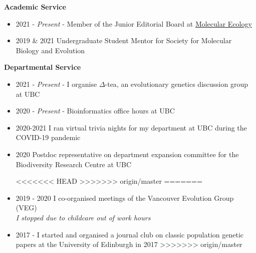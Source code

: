 \documentclass[11pt]{article}
\makeatletter
\newlength{\bibhang}
\newlength{\bibsep}
 {\@listi \global\bibsep\itemsep \global\advance\bibsep by\parsep}
\newenvironment{bibsection}%
        {\begin{etaremune}{}{%
       \setlength{\leftmargin}{\bibhang}%
       \setlength{\itemindent}{-\leftmargin}%
       \setlength{\itemsep}{\bibsep}%
       \setlength{\parsep}{\z@}%
        \setlength{\partopsep}{0pt}%
        \setlength{\topsep}{0pt}}}
        {\end{etaremune}\vspace{-.6\baselineskip}}
\newenvironment{innerlist}[1][\enskip\textbullet]%
        {\begin{itemize}[#1,leftmargin=*,parsep=0pt,itemsep=0pt,topsep=0pt,partopsep=0pt]}
        {\end{itemize}}
\newcommand{\halfblankline}{\quad\vspace{-0.3\baselineskip}\pagebreak[2]}
\makeatother
\begin{document}
\begin{bibsection}
\begin{innerlist}
\begin{innerlist}
\halfblankline

  \setlength\itemsep{0.3em}

	\end{innerlist}

	\vspace{.1275in}

	{\bf Academic Service}
\begin{innerlist}

	\item[] 2021 - \textit{Present} - Member of the Junior Editorial Board at \href{https://onlinelibrary.wiley.com/page/journal/1365294x/homepage/editorialboard.html}{Molecular Ecology}
	
	\item[] 2019 \& 2021 Undergraduate Student Mentor for Society for Molecular Biology and Evolution
	
\end{innerlist}
\vspace{.1275in}


	{\bf Departmental Service}
\vspace{.1275in}

\begin{innerlist}
  \setlength\itemsep{0.3em}

	\item[] 2021 - \textit{Present} - I organise $\Delta$-tea, an evolutionary genetics discussion group at UBC
	
	\item[] 2020 - \textit{Present} - Bioinformatics office hours at UBC 
	
	\item[] 2020-2021  I ran virtual trivia nights for my department at UBC during the COVID-19 pandemic
	
	\item[] 2020  Postdoc representative on department expansion committee for the Biodiversity Research Centre at UBC


<<<<<<< HEAD
>>>>>>> origin/master
=======
	\item[] 2019 - 2020 I co-organised meetings of the Vancouver Evolution Group (VEG)\\\emph{I stopped due to childcare out of work hours}

	\item[] 2017 - I started and organised a journal club on classic population genetic papers at the University of Edinburgh in 2017
>>>>>>> origin/master

\end{innerlist}
\vspace{.1275in}


\end{innerlist}
\end{bibsection}
\end{document}
